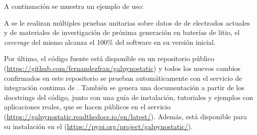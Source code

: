 A continuación se muestra un ejemplo de uso:



A  se le realizan múltiples pruebas unitarias sobre datos de
de electrodos actuales y de materiales de investigación de próxima generación en 
baterías de litio, el \textit{coverage} del mismo alcanza el 100\% del software
en su versión inicial.

Por último, el código fuente está disponible en un repositorio público 
(\url{https://github.com/fernandezfran/galpynostatic}) y todos los nuevos cambios 
confirmados en este repositorio se prueban automáticamente con el servicio de 
integración continua de  . También se genera una documentación a 
partir de los docstrings del código, junto con una guía de instalación,
tutoriales y ejemplos con aplicaciones reales, que se hacen públicos en el 
servicio  (\url{https://galpynostatic.readthedocs.io/en/latest/}). 
Además,  está disponible para su instalación en el 
 (\url{https://pypi.org/project/galpynostatic/}).

%
%
%
%
%
%
%
%
%
